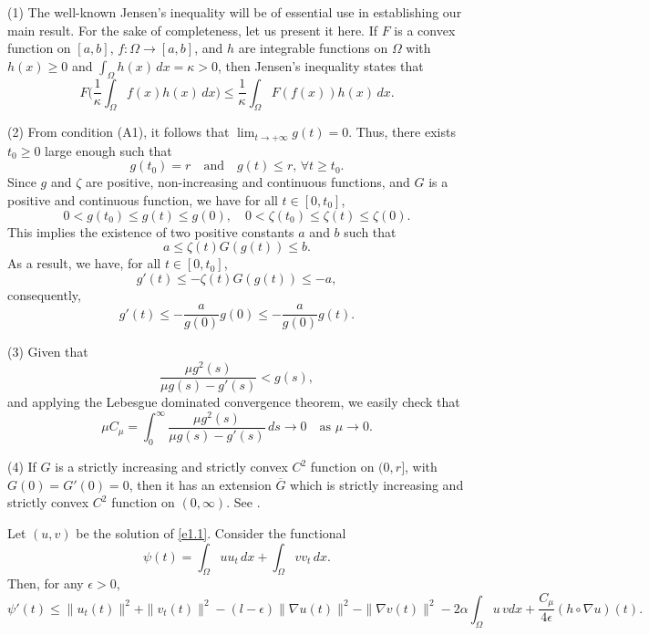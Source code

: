 \documentclass[reqno]{amsart}
\begin{document}
\begin{remark} \label{rmk6} \rm
(1) The well-known Jensen's inequality will be of essential use in establishing our
 main result. For the sake of completeness, let us present it here.
 If \( F \) is a convex function on \( [a, b] \), \( f : \Omega \to [a, b] \), and
 \( h \) are integrable functions on \( \Omega \) with
 \( h(x) \geq 0 \) and $\int_\Omega h(x)\,dx = \kappa > 0$,
then Jensen's inequality states that
\[
F\Big( \frac{1}{\kappa} \int_\Omega f(x) h(x)\,dx \Big)
\leq \frac{1}{\kappa} \int_\Omega F(f(x)) h(x)\,dx.
\]

(2) From condition (A1), it follows that $ \lim_{t \to +\infty} g(t) = 0$.
Thus, there exists \( t_0 \geq 0 \) large enough such that
\[
g(t_0) = r \quad \text{and} \quad g(t) \leq r, \, \forall t \geq t_0.
\]
Since $g$ and $\zeta$ are positive, non-increasing and continuous functions, and
$G$ is a positive and continuous function, we have for all \( t \in [0, t_0] \),
\[
0 < g(t_0) \leq g(t) \leq g(0), \quad 0 < \zeta(t_0) \leq \zeta(t) \leq \zeta(0).
\]
This implies the existence of two positive constants \( a \) and \( b \) such that
\[
a \leq \zeta(t) G(g(t)) \leq b.
\]
As a result, we have, for all \( t \in [0, t_0] \),
\[
g'(t) \leq -\zeta(t) G(g(t)) \leq -a,
\]
consequently,
\[
g'(t) \leq -\frac{a}{g(0)} g(0) \leq -\frac{a}{g(0)} g(t). \label{e4.7}
\]

(3) Given that
\[
\frac{\mu g^2(s)}{\mu g(s) - g'(s)} < g(s),
\]
and applying the Lebesgue dominated convergence theorem, we easily check that
\[
\mu C_\mu = \int_0^\infty \frac{\mu g^2(s)}{\mu g(s) - g'(s)} \, ds \to 0
\quad \text{as } \mu \to 0.
\]

(4) If $G$ is a strictly increasing and strictly convex $C^2$ function on $(0, r]$,
with $G(0) = G'(0) = 0$, then it has an extension $\overline{G}$ which is strictly
increasing and strictly convex $C^2$ function on $(0, \infty)$.
See \cite{MustafaMuhammadR}.
\end{remark}

\begin{lemma} \label{lem7}
Let $(u,v)$ be the solution of \eqref{e1.1}. Consider the functional
\[
 \psi(t) = \int_{\Omega} uu_t \, dx +\int_{\Omega} vv_t \, dx.
\]
Then, for any \(\epsilon > 0\),
\begin{equation}
 \psi '(t) \leq \| u_t(t) \|^2 +\| v_t(t) \|^2 - (l-\epsilon) \| \nabla u(t) \|^2 - \| \nabla v (t)\|^2 -2 \alpha \int_{\Omega} u \, v dx + \frac{ C_\mu }{4\epsilon} (h \circ \nabla u)(t).
 \label{e4.8}
\end{equation}
\end{lemma}
\end{document}

